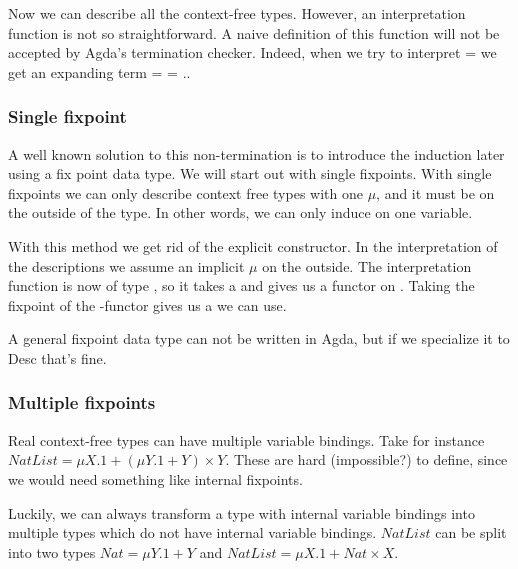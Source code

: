 Now we can describe all the context-free types.
However, an interpretation function  is not so
straightforward.
A naive definition of this function will not be accepted by Agda's
termination checker.
Indeed, when we try to interpret  =   
\AY{(}\AF{\#} \AY{)} we get an expanding term  
 =      = ..

\subsubsection{Single fixpoint}

A well known solution to this non-termination is to introduce the
induction later using a fix point data type.
We will start out with single fixpoints.
With single fixpoints we can only describe context free types with one
$μ$, and it must be on the outside of the type.
In other words, we can only induce on one variable.

With this method we get rid of the explicit  constructor.
In the interpretation of the descriptions we assume an implicit $μ$ on
the outside.
The interpretation function  is now of type  
  , so it takes a  and gives us a
functor on .
Taking the fixpoint of the -functor gives us a  we can
use.


\begin{shaded}
  A general fixpoint data type can not be written in Agda, but if we
  specialize it to Desc that's fine.
\end{shaded}

\subsubsection{Multiple fixpoints}\label{sec:lit-cft-multi}

Real context-free types can have multiple variable bindings.
Take for instance $NatList = μX. 1 + (μY. 1 + Y) × Y$.
These are hard (impossible?) to define, since we would need something
like internal fixpoints.

Luckily, we can always transform a type with internal variable
bindings into multiple types which do not have internal variable
bindings.
$NatList$ can be split into two types $Nat = μY. 1 + Y$ and $NatList =
μX. 1 + Nat × X$.

